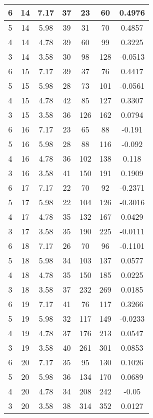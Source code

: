 \documentclass[letterpaper, 12pt]{article}
\begin{document}
\begin{longtable}{|c|c|c|c|c|c|c|}
\hline
6 & 14 & 7.17 & 37 & 23 & 60 & 0.4976 \\
\hline
5 & 14 & 5.98 & 39 & 31 & 70 & 0.4857 \\
\hline
4 & 14 & 4.78 & 39 & 60 & 99 & 0.3225 \\
\hline
3 & 14 & 3.58 & 30 & 98 & 128 & -0.0513 \\
\hline
6 & 15 & 7.17 & 39 & 37 & 76 & 0.4417 \\
\hline
5 & 15 & 5.98 & 28 & 73 & 101 & -0.0561 \\
\hline
4 & 15 & 4.78 & 42 & 85 & 127 & 0.3307 \\
\hline
3 & 15 & 3.58 & 36 & 126 & 162 & 0.0794 \\
\hline
6 & 16 & 7.17 & 23 & 65 & 88 & -0.191 \\
\hline
5 & 16 & 5.98 & 28 & 88 & 116 & -0.092 \\
\hline
4 & 16 & 4.78 & 36 & 102 & 138 & 0.118 \\
\hline
3 & 16 & 3.58 & 41 & 150 & 191 & 0.1909 \\
\hline
6 & 17 & 7.17 & 22 & 70 & 92 & -0.2371 \\
\hline
5 & 17 & 5.98 & 22 & 104 & 126 & -0.3016 \\
\hline
4 & 17 & 4.78 & 35 & 132 & 167 & 0.0429 \\
\hline
3 & 17 & 3.58 & 35 & 190 & 225 & -0.0111 \\
\hline
6 & 18 & 7.17 & 26 & 70 & 96 & -0.1101 \\
\hline
5 & 18 & 5.98 & 34 & 103 & 137 & 0.0577 \\
\hline
4 & 18 & 4.78 & 35 & 150 & 185 & 0.0225 \\
\hline
3 & 18 & 3.58 & 37 & 232 & 269 & 0.0185 \\
\hline
6 & 19 & 7.17 & 41 & 76 & 117 & 0.3266 \\
\hline
5 & 19 & 5.98 & 32 & 117 & 149 & -0.0233 \\
\hline
4 & 19 & 4.78 & 37 & 176 & 213 & 0.0547 \\
\hline
3 & 19 & 3.58 & 40 & 261 & 301 & 0.0853 \\
\hline
6 & 20 & 7.17 & 35 & 95 & 130 & 0.1026 \\
\hline
5 & 20 & 5.98 & 36 & 134 & 170 & 0.0689 \\
\hline
4 & 20 & 4.78 & 34 & 208 & 242 & -0.05 \\
\hline
3 & 20 & 3.58 & 38 & 314 & 352 & 0.0127 \\
\hline
\end{longtable}
\end{document}
